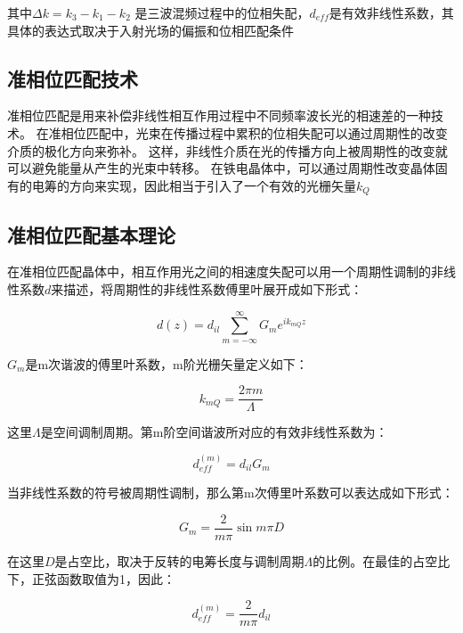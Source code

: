 \documentclass[a4paper,UTF8]{ctexart}
\begin{document}
其中$\Delta k = k_3 - k_1 -k_2$ 是三波混频过程中的位相失配，$d_{eff}$是有效非线性系数，其具体的表达式取决于入射光场的偏振和位相匹配条件

\subsection{准相位匹配技术}

准相位匹配是用来补偿非线性相互作用过程中不同频率波长光的相速差的一种技术。
在准相位匹配中，光束在传播过程中累积的位相失配可以通过周期性的改变介质的极化方向来弥补。
这样，非线性介质在光的传播方向上被周期性的改变就可以避免能量从产生的光束中转移。
在铁电晶体中，可以通过周期性改变晶体固有的电筹的方向来实现，因此相当于引入了一个有效的光栅矢量$k_Q$



\subsection{准相位匹配基本理论}

在准相位匹配晶体中，相互作用光之间的相速度失配可以用一个周期性调制的非线性系数$d$来描述，将周期性的非线性系数傅里叶展开成如下形式：

\begin{equation}
    d(z) = d_{il} \sum_{m=-\infty}^{\infty} G_m e^{i k_{mQ} z}
\end{equation}

$G_m$是m次谐波的傅里叶系数，m阶光栅矢量定义如下：

\begin{equation}
    k_{mQ} = \frac{2\pi m}{\Lambda}
\end{equation}

这里$\Lambda$是空间调制周期。第m阶空间谐波所对应的有效非线性系数为：

\begin{equation}
    d_{eff}^{(m)} = d_{il} G_m
\end{equation}

当非线性系数的符号被周期性调制，那么第m次傅里叶系数可以表达成如下形式：

\begin{equation}
    G_m = \frac{2}{m\pi} \sin{m\pi D}
\end{equation}

在这里$D$是占空比，取决于反转的电筹长度与调制周期$\Lambda$的比例。在最佳的占空比下，正弦函数取值为1，因此：

\begin{equation}
    d_{eff}^{(m)} = \frac{2}{m\pi}d_{il}
\end{equation}
\end{document}
